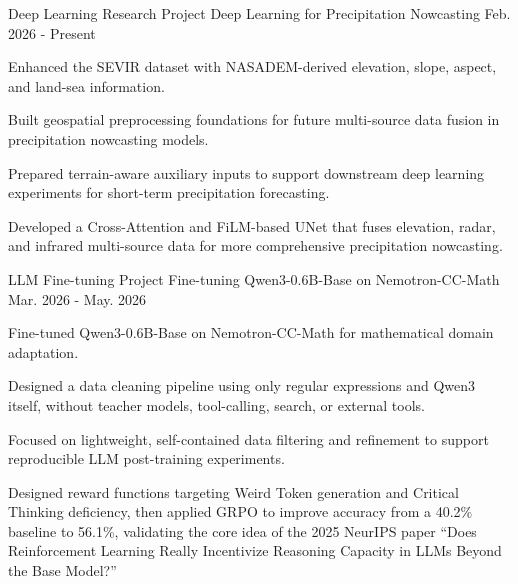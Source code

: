

\begin{cventries}

  \cventry
    {Deep Learning Research Project} %
    {Deep Learning for Precipitation Nowcasting} %
    {} %
    {Feb. 2026 - Present} %
    {
      \begin{cvitems} %
        \item {Enhanced the SEVIR dataset with NASADEM-derived elevation, slope, aspect, and land-sea information.}
        \item {Built geospatial preprocessing foundations for future multi-source data fusion in precipitation nowcasting models.}
        \item {Prepared terrain-aware auxiliary inputs to support downstream deep learning experiments for short-term precipitation forecasting.}
        \item {Developed a Cross-Attention and FiLM-based UNet that fuses elevation, radar, and infrared multi-source data for more comprehensive precipitation nowcasting.}
      \end{cvitems}
    }

  \cventry
    {LLM Fine-tuning Project} %
    {Fine-tuning Qwen3-0.6B-Base on Nemotron-CC-Math} %
    {} %
    {Mar. 2026 - May. 2026} %
    {
      \begin{cvitems} %
        \item {Fine-tuned Qwen3-0.6B-Base on Nemotron-CC-Math for mathematical domain adaptation.}
        \item {Designed a data cleaning pipeline using only regular expressions and Qwen3 itself, without teacher models, tool-calling, search, or external tools.}
        \item {Focused on lightweight, self-contained data filtering and refinement to support reproducible LLM post-training experiments.}
        \item {Designed reward functions targeting Weird Token generation and Critical Thinking deficiency, then applied GRPO to improve accuracy from a 40.2\% baseline to 56.1\%, validating the core idea of the 2025 NeurIPS paper ``Does Reinforcement Learning Really Incentivize Reasoning Capacity in LLMs Beyond the Base Model?''}
      \end{cvitems}
    }


\end{cventries}
